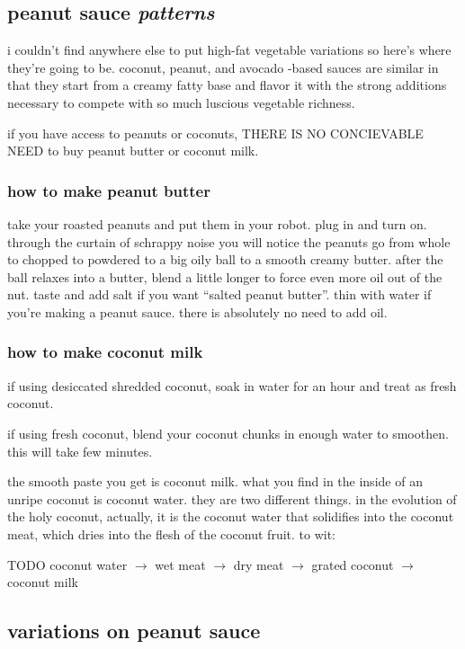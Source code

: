 \subsection{peanut sauce \textit{patterns}}

i couldn't find anywhere else to put high-fat vegetable variations so here's 
where they're going to be. coconut, peanut, and avocado -based sauces are 
similar in that they start from a creamy fatty base and flavor it with the 
strong additions necessary to compete with so much luscious vegetable richness.

if you have access to peanuts or coconuts, THERE IS NO CONCIEVABLE NEED to buy 
peanut butter or coconut milk.

\subsubsection{how to make peanut butter}

take your roasted peanuts and put them in your robot. plug in and turn on.
through the curtain of schrappy noise you will notice the peanuts go from 
whole to chopped to powdered to a big oily ball to a smooth creamy butter. 
after the ball relaxes into a butter, blend a little longer to force even 
more oil out of the nut. taste and add salt if you want ``salted peanut 
butter''. thin with water if you're making a peanut sauce. there is absolutely 
no need to add oil.

\subsubsection{how to make coconut milk}

if using desiccated shredded coconut, soak in water for an hour and treat as 
fresh coconut.

if using fresh coconut, blend your coconut chunks in enough water to smoothen. 
this will take few minutes.

the smooth paste you get is coconut milk. what you find in the inside of an 
unripe coconut is coconut water. they are two different things. in the 
evolution of the holy coconut, actually, it is the coconut water that 
solidifies into the coconut meat, which dries into the flesh of the coconut 
fruit. to wit:

TODO
coconut water $\rightarrow$ wet meat $\rightarrow$ dry meat $\rightarrow$ 
grated coconut $\rightarrow$ coconut milk

\subsection{variations on peanut sauce}

